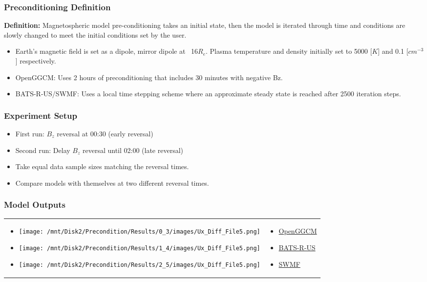 \begin{frame}
\frametitle{Preconditioning Definition}
\textbf{Definition:} Magnetospheric model pre-conditioning takes an
initial state, then the model is iterated through time and conditions are slowly
changed to meet the initial conditions set by the user.
\begin{itemize}
  \item Earth's magnetic field is set as a dipole, mirror dipole at ~16$R_e$. Plasma temperature and density initially set to 5000 [$K$] and 0.1
  [$cm^{-3}$] respectively.
  \item OpenGGCM: Uses 2 hours of preconditioning that includes 30 minutes with
  negative Bz.
  \item BATS-R-US/SWMF: Uses a local time stepping scheme where an approximate
  steady state is reached after 2500 iteration steps.
\end{itemize}
\end{frame}

\begin{frame}[shrink]
\frametitle{Experiment Setup}
\begin{itemize}
  \item First run: $B_z$ reversal at 00:30 (early reversal)
  \item Second run: Delay $B_z$ reversal until 02:00 (late reversal)
  \item Take equal data sample sizes matching the reversal times.
  \item Compare models with themselves at two different reversal times.
\end{itemize}
\end{frame}

\begin{frame}
\frametitle{Model Outputs}
\begin{tabular}{p{}p{}}
\begin{itemize}
  \item[]
  \texttt{[image: /mnt/Disk2/Precondition/Results/0\_3/images/Ux\_Diff\_File5.png]}
  \item[]
  \texttt{[image: /mnt/Disk2/Precondition/Results/1\_4/images/Ux\_Diff\_File5.png]}
  \item[]
  \texttt{[image: /mnt/Disk2/Precondition/Results/2\_5/images/Ux\_Diff\_File5.png]}
\end{itemize}
 &
\begin{itemize}
  \setlength{\itemsep}{43pt}
  \item \href{images/2_PreconditionOpenGGCM.pdf}{OpenGGCM}
  \item \href{images/3_PreconditionBATSRUS.pdf}{BATS-R-US}
  \item \href{images/4_PreconditionSWMF.pdf}{SWMF}
\end{itemize}
\end{tabular}
\end{frame}

